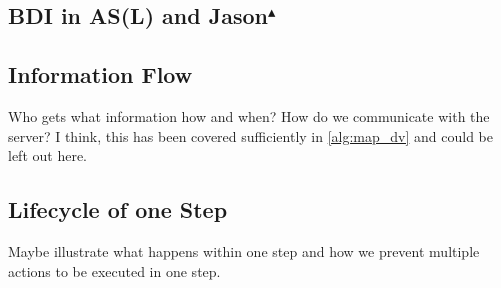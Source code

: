 \subsection{BDI in AS(L) and Jason$^{\blacktriangle}$}

\subsection{Information Flow}
Who gets what information how and when? How do we communicate with the server? I think, this has been covered sufficiently in \autoref{alg:map_dv} and could be left out here.
\subsection{Lifecycle of one Step}
Maybe illustrate what happens within one step and how we prevent multiple actions to be executed in one step.
